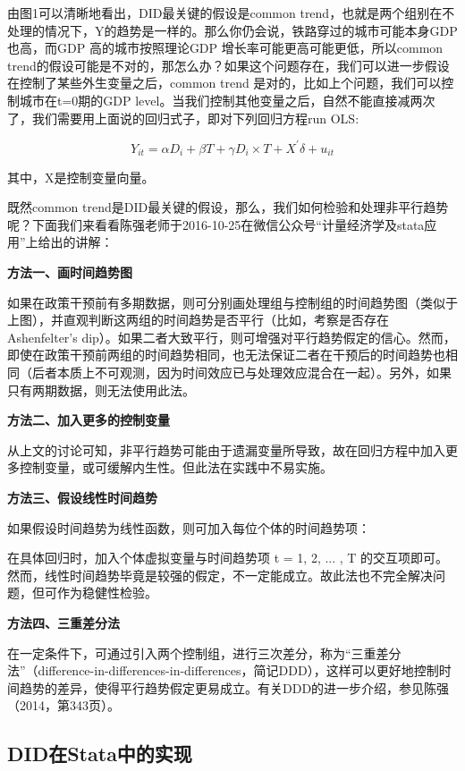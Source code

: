 \documentclass[cn,10pt,math=newtx,citestyle=gb7714-2015,bibstyle=gb7714-2015]{elegantbook}
\begin{document}
	由图1可以清晰地看出，DID最关键的假设是common trend，也就是两个组别在不处理的情况下，Y的趋势是一样的。那么你仍会说，铁路穿过的城市可能本身GDP也高，而GDP 高的城市按照理论GDP 增长率可能更高可能更低，所以common trend的假设可能是不对的，那怎么办？如果这个问题存在，我们可以进一步假设在控制了某些外生变量之后，common trend 是对的，比如上个问题，我们可以控制城市在t=0期的GDP level。当我们控制其他变量之后，自然不能直接减两次了，我们需要用上面说的回归式子，即对下列回归方程run OLS:
	
	\begin{equation}
		Y_{it}=\alpha{D}_i+\beta{T}+\gamma{D_i\times{T}}+X^{'}\delta+u_{it}
	\end{equation}
	
	其中，X是控制变量向量。
	
	既然common trend是DID最关键的假设，那么，我们如何检验和处理非平行趋势呢？下面我们来看看陈强老师于2016-10-25在微信公众号“计量经济学及stata应用”上给出的讲解：
	
	\textbf{方法一、画时间趋势图}
	
	如果在政策干预前有多期数据，则可分别画处理组与控制组的时间趋势图（类似于上图），并直观判断这两组的时间趋势是否平行（比如，考察是否存在Ashenfelter's dip）。如果二者大致平行，则可增强对平行趋势假定的信心。然而，即使在政策干预前两组的时间趋势相同，也无法保证二者在干预后的时间趋势也相同（后者本质上不可观测，因为时间效应已与处理效应混合在一起）。另外，如果只有两期数据，则无法使用此法。
	
	\textbf{方法二、加入更多的控制变量}
	
	从上文的讨论可知，非平行趋势可能由于遗漏变量所导致，故在回归方程中加入更多控制变量，或可缓解内生性。但此法在实践中不易实施。
	
	\textbf{方法三、假设线性时间趋势}
	
	如果假设时间趋势为线性函数，则可加入每位个体的时间趋势项：
	
	在具体回归时，加入个体虚拟变量与时间趋势项 t = 1, 2, ... , T 的交互项即可。然而，线性时间趋势毕竟是较强的假定，不一定能成立。故此法也不完全解决问题，但可作为稳健性检验。
	
	\textbf{方法四、三重差分法}
	
	在一定条件下，可通过引入两个控制组，进行三次差分，称为“三重差分法”（difference-in-differences-in-differences，简记DDD），这样可以更好地控制时间趋势的差异，使得平行趋势假定更易成立。有关DDD的进一步介绍，参见陈强（2014，第343页）。
	
	\subsection{DID在Stata中的实现}
	
\end{document}
